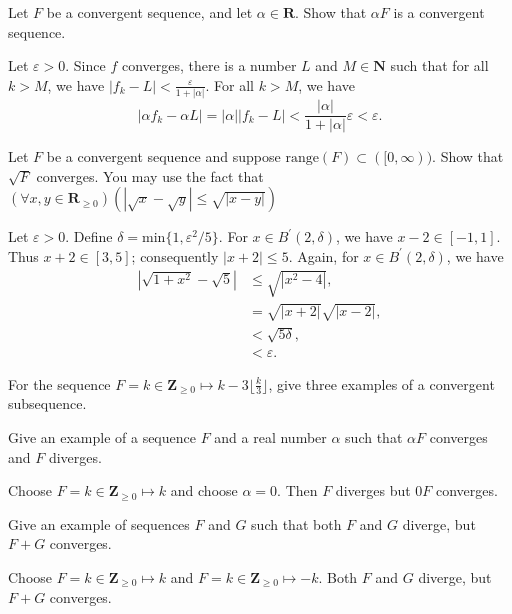 \documentclass[12pt, fleqn, answers]{exam}
\newcommand{\reals}{\mathbf{R}}
\newcommand{\integers}{\mathbf{Z}}
\newcommand{\range}{\mathrm{range}}
\begin{document}
\begin{questions}

\question Let \(F\) be a convergent sequence, and let \(\alpha \in
\reals\).  Show that \(\alpha F\) is a convergent sequence.



\begin{solution}%
Let \(\varepsilon > 0\). Since \(f\) converges, there is a number \(L\) and 
\(M \in \mathbf{N}\) such that for all \(k > M\), we have \(|f_k - L| < \frac{\varepsilon}{1 + |\alpha|}\).
For all \(k > M\), we have
\[
  |\alpha f_k - \alpha L| = |\alpha| |f_k - L|
                          < \frac{ |\alpha|}{1 + |\alpha|} \varepsilon
                          < \varepsilon.
\]

\end{solution}

\question Let $F$ be a convergent sequence and suppose $\range(F) \subset([0,\infty))$. Show that $\sqrt{F}$ converges.
You may use the fact that $\left(\forall x,y \in \reals_{\geq 0}\right)  (| \sqrt{x} - \sqrt{y} | \leq \sqrt{|x - y|} )$

\begin{solution}
Let \(\varepsilon > 0\). Define \(\delta = \mbox{min}\{1, \varepsilon^2 / 5\}\). 
For \(x \in B^\prime(2, \delta)\), we
have \(x - 2 \in [-1,1]\). Thus \(x + 2 \in [3,5]\); consequently
\(|x+2| \leq 5\). Again, for \(x \in B^\prime(2, \delta)\), we have
\begin{align*}
  |\sqrt{1+x^2} - \sqrt{5} | &\leq \sqrt{|x^2 - 4|}, \\ 
                             &= \sqrt{|x + 2|} \sqrt{|x - 2|}, \\
                             &< \sqrt{5 \delta}, \\
                             &< \varepsilon.
\end{align*}
\end{solution}

\question For the sequence $F  = k \in \integers_{\geq 0} \mapsto k - 3 \lfloor \frac{k}{3} \rfloor $, give three examples of
a convergent subsequence.

\question Give an example of a sequence $F$ and a real number $\alpha$ such that $\alpha F$ converges and $F$ diverges.
\begin{solution} Choose $F = k \in \integers_{\geq 0} \mapsto k$ and choose $\alpha = 0$. Then $F$ diverges but $0F$ 
converges.
\end{solution}
 \question Give an example of sequences $F$ and $G$ such that both $F$ and $G$ diverge, but $F+ G$ converges.
 \begin{solution} Choose $F = k \in \integers_{\geq 0} \mapsto k$ and $F = k \in \integers_{\geq 0} \mapsto -k$.
 Both $F$ and $G$ diverge, but $F+G$ converges.
 \end{solution}
 

\end{questions}
\end{document}
